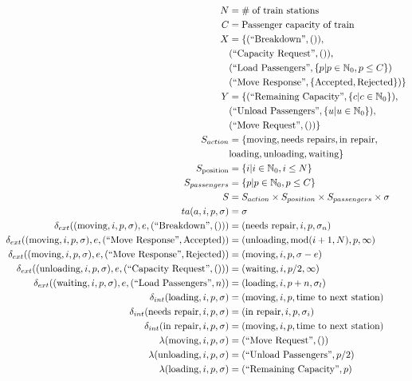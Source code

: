 \newcommand{\Mod}[2]{\mathrm{mod} (#1, #2)}

\begin{align*}
    N &= \# \text{\;of train stations} \\
    C &= \text{Passenger capacity of train} \\
    X &= \{
      \InBreakDown, \\
      &  \InCapReq, \\
      &  \InLoadPassengers{\{ p | p \in \mathbb{N}_0, p \leq C \}} \\
      &  \InMoveRes{\{ \text{Accepted}, \text{Rejected} \}}
    \} \\
    Y &= \{
      \OutRemainingCapacity{\{ c | c \in \mathbb{N}_0 \}}, \\
      &  \OutUnloadPassengers{\{ u | u \in \mathbb{N}_0 \}}, \\
      &  \OutMoveReq
    \} \\
    S_{action} &= \{
      \text{moving}, \text{needs repairs}, \text{in repair}, \\
      &  \text{loading}, \text{unloading}, \text{waiting} 
    \} \\
    S_{\text{position}} &= \{ i | i \in \mathbb{N}_0, i \leq N
    \} \\
    S_{passengers} &= \{ p | p \in \mathbb{N}_0, p \leq C \} \\
    S &= S_{action} \times S_{position} \times S_{passengers} \times \sigma \\
    ta(a, i, p, \sigma) &= \sigma \\
    \delta_{ext}((\text{moving}, i, p, \sigma), e, \InBreakDown) &= (\text{needs
        repair}, i, p, \sigma_n) \\
    \delta_{ext}((\text{moving}, i, p, \sigma), e, \InMoveRes{\text{Accepted}}) &=
        (\text{unloading}, \Mod{i+1}{N}, p, \infty) \\
    \delta_{ext}((\text{moving}, i, p, \sigma), e, \InMoveRes{\text{Rejected}}) &=
        (\text{moving}, i, p, \sigma - e) \\
    \delta_{ext}((\text{unloading}, i, p, \sigma), e, \InCapReq) &=
        (\text{waiting}, i, p/2, \infty) \\
    \delta_{ext}((\text{waiting}, i, p, \sigma), e, \InLoadPassengers{n}) &=
        (\text{loading}, i, p + n, \sigma_l) \\
    \delta_{int}(\text{loading}, i, p, \sigma) &= (\text{moving}, i, p,
        \text{time to next station}) \\
    \delta_{int}(\text{needs repair}, i, p, \sigma) &= (\text{in repair}, i, p,
        \sigma_i) \\
    \delta_{int}(\text{in repair}, i, p, \sigma) &= (\text{moving}, i, p,
        \text{time to next station}) \\  
    \lambda(\text{moving}, i, p, \sigma) &= \OutMoveReq \\
    \lambda(\text{unloading}, i, p, \sigma) &= \OutUnloadPassengers{p/2} \\
    \lambda(\text{loading}, i, p, \sigma) &= \OutRemainingCapacity{p}
\end{align*}
